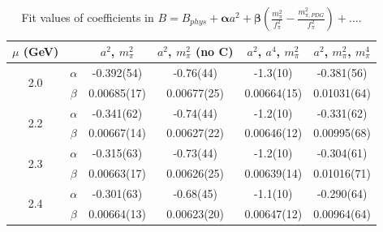 \documentclass[12pt]{extarticle}
\begin{document}
\begin{table}[h!]
\begin{center}
\begin{tabular}{|c c|c|c|c|c|}
\hline
$\mu$ (GeV) &  & $a^2$, $m_\pi^2$& $a^2$, $m_\pi^2$ (no C)& $a^2$, $a^4$, $m_\pi^2$& $a^2$, $m_\pi^2$, $m_\pi^4$\\
\hline
\multirow{2}{0.5in}{2.0} & $\alpha$ & -0.392(54)& -0.76(44)& -1.3(10)& -0.381(56)\\
 & $\beta$ & 0.00685(17)& 0.00677(25)& 0.00664(15)& 0.01031(64)\\
\hline
\multirow{2}{0.5in}{2.2} & $\alpha$ & -0.341(62)& -0.74(44)& -1.2(10)& -0.331(62)\\
 & $\beta$ & 0.00667(14)& 0.00627(22)& 0.00646(12)& 0.00995(68)\\
\hline
\multirow{2}{0.5in}{2.3} & $\alpha$ & -0.315(63)& -0.73(44)& -1.2(10)& -0.304(61)\\
 & $\beta$ & 0.00663(17)& 0.00626(25)& 0.00639(14)& 0.01016(71)\\
\hline
\multirow{2}{0.5in}{2.4} & $\alpha$ & -0.301(63)& -0.68(45)& -1.1(10)& -0.290(64)\\
 & $\beta$ & 0.00664(13)& 0.00623(20)& 0.00647(12)& 0.00964(64)\\
\hline
\end{tabular}
\caption{Fit values of coefficients in $B = B_{phys} + \mathbf{\alpha} a^2 + \mathbf{\beta}\left(\frac{m_\pi^2}{f_\pi^2}-\frac{m_{\pi,PDG}^2}{f_\pi^2}\right) + \ldots$.}
\end{center}
\end{table}
















\clearpage
\end{document}
